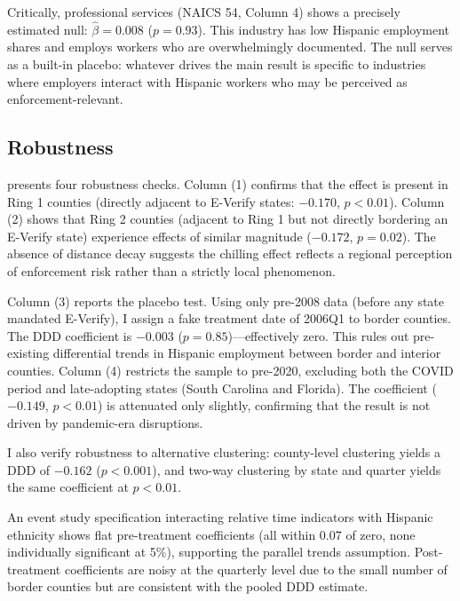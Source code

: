 \documentclass[12pt]{article}
\begin{document}
Critically, professional services (NAICS 54, Column 4) shows a precisely estimated null: $\hat{\beta} = 0.008$ ($p = 0.93$). This industry has low Hispanic employment shares and employs workers who are overwhelmingly documented. The null serves as a built-in placebo: whatever drives the main result is specific to industries where employers interact with Hispanic workers who may be perceived as enforcement-relevant.

\subsection{Robustness}



 presents four robustness checks. Column (1) confirms that the effect is present in Ring 1 counties (directly adjacent to E-Verify states: $-0.170$, $p < 0.01$). Column (2) shows that Ring 2 counties (adjacent to Ring 1 but not directly bordering an E-Verify state) experience effects of similar magnitude ($-0.172$, $p = 0.02$). The absence of distance decay suggests the chilling effect reflects a regional perception of enforcement risk rather than a strictly local phenomenon.

Column (3) reports the placebo test. Using only pre-2008 data (before any state mandated E-Verify), I assign a fake treatment date of 2006Q1 to border counties. The DDD coefficient is $-0.003$ ($p = 0.85$)---effectively zero. This rules out pre-existing differential trends in Hispanic employment between border and interior counties. Column (4) restricts the sample to pre-2020, excluding both the COVID period and late-adopting states (South Carolina and Florida). The coefficient ($-0.149$, $p < 0.01$) is attenuated only slightly, confirming that the result is not driven by pandemic-era disruptions.

I also verify robustness to alternative clustering: county-level clustering yields a DDD of $-0.162$ ($p < 0.001$), and two-way clustering by state and quarter yields the same coefficient at $p < 0.01$.

An event study specification interacting relative time indicators with Hispanic ethnicity shows flat pre-treatment coefficients (all within 0.07 of zero, none individually significant at 5\%), supporting the parallel trends assumption. Post-treatment coefficients are noisy at the quarterly level due to the small number of border counties but are consistent with the pooled DDD estimate.
\end{document}
